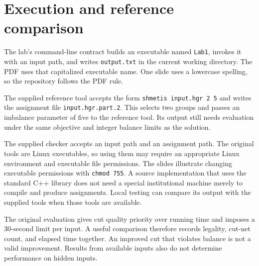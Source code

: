 \documentclass[11pt,a4paper]{article}
\begin{document}
\section{Execution and reference comparison}

The lab's command-line contract builds an executable named \texttt{Lab1}, invokes it with an input path, and writes \texttt{output.txt} in the current working directory. The PDF uses that capitalized executable name. One slide uses a lowercase spelling, so the repository follows the PDF rule.

The supplied reference tool accepts the form \texttt{shmetis input.hgr 2 5} and writes the assignment file \texttt{input.hgr.part.2}. This selects two groups and passes an imbalance parameter of five to the reference tool. Its output still needs evaluation under the same objective and integer balance limits as the solution.

The supplied checker accepts an input path and an assignment path. The original tools are Linux executables, so using them may require an appropriate Linux environment and executable file permissions. The slides illustrate changing executable permissions with \texttt{chmod 755}. A source implementation that uses the standard C++ library does not need a special institutional machine merely to compile and produce assignments. Local testing can compare its output with the supplied tools when those tools are available.

The original evaluation gives cut quality priority over running time and imposes a $30$-second limit per input. A useful comparison therefore records legality, cut-net count, and elapsed time together. An improved cut that violates balance is not a valid improvement. Results from available inputs also do not determine performance on hidden inputs.
\end{document}
